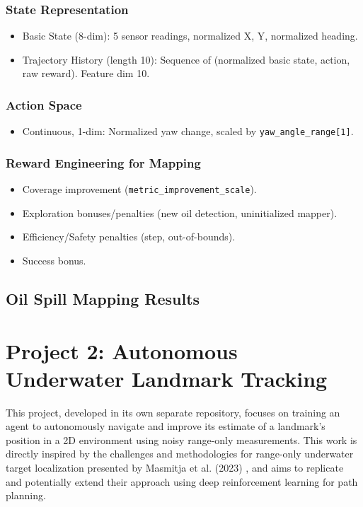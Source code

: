 \documentclass[11pt,a4paper]{article}
\newcommand{\code}[1]{\texttt{#1}} %
\begin{document}
\subsubsection{State Representation}
\begin{itemize}
    \item Basic State (8-dim): 5 sensor readings, normalized X, Y, normalized heading.
    \item Trajectory History (length 10): Sequence of (normalized basic state, action, raw reward). Feature dim 10.
\end{itemize}

\subsubsection{Action Space}
\begin{itemize}
    \item Continuous, 1-dim: Normalized yaw change, scaled by \code{yaw\_angle\_range[1]}.
\end{itemize}

\subsubsection{Reward Engineering for Mapping}
\begin{itemize}
    \item Coverage improvement (\code{metric\_improvement\_scale}).
    \item Exploration bonuses/penalties (new oil detection, uninitialized mapper).
    \item Efficiency/Safety penalties (step, out-of-bounds).
    \item Success bonus.
\end{itemize}

\subsection{Oil Spill Mapping Results}

\section{Project 2: Autonomous Underwater Landmark Tracking}
This project, developed in its own separate repository, focuses on training an agent to autonomously navigate and improve its estimate of a landmark's position in a 2D environment using noisy range-only measurements. This work is directly inspired by the challenges and methodologies for range-only underwater target localization presented by Masmitja et al. (2023) \cite{masmitja2023tracking}, and aims to replicate and potentially extend their approach using deep reinforcement learning for path planning.
\end{document}
